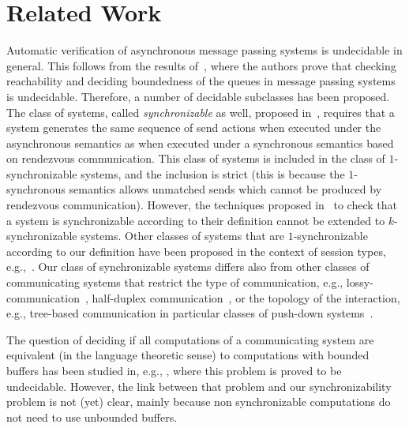 \section{Related Work}\label{sec:related}

Automatic verification of asynchronous message passing systems is undecidable in general. This follows from the results of~\cite{DBLP:journals/jacm/BrandZ83}, where the authors prove that checking reachability and deciding boundedness of the queues in message passing systems is undecidable. Therefore, a number of decidable subclasses has been proposed. 
The class of systems, called \emph{synchronizable} as well, proposed in~\cite{DBLP:journals/tcs/BasuB16}, requires that a system generates the same sequence of send actions when executed under the asynchronous semantics as when executed under a synchronous semantics based on rendezvous communication. This class of systems is included in the class of $1$-synchronizable systems, and the inclusion is strict (this is because the $1$-synchronous semantics allows unmatched sends which cannot be produced by rendezvous communication). However, the techniques proposed in~\cite{DBLP:journals/tcs/BasuB16} to check that a system is synchronizable according to their definition cannot be extended to $k$-synchronizable systems.
Other classes of systems that are $1$-synchronizable according to our definition have been proposed in the context of session types, e.g.,~\cite{DBLP:conf/esop/DenielouY12,DBLP:journals/jacm/HondaYC16,DBLP:conf/esop/HondaVK98,DBLP:conf/popl/LangeTY15}. 
Our class of synchronizable systems differs also from other classes of communicating systems that restrict the type of communication, e.g., lossy-communication~\cite{DBLP:journals/iandc/AbdullaJ96}, half-duplex communication~\cite{DBLP:journals/iandc/CeceF05}, or the topology of the interaction, e.g., tree-based communication in particular classes of push-down systems~\cite{DBLP:conf/tacas/TorreMP08,DBLP:journals/corr/abs-1209-0359}.

The question of deciding if all computations of a communicating system are equivalent (in the language theoretic sense) to computations with bounded buffers has been studied in, e.g., \cite{DBLP:journals/fuin/GenestKM07}, where this problem is proved to be undecidable. However, the link between that problem and our synchronizability problem is not (yet) clear, mainly because non synchronizable computations do not need to use unbounded buffers.

